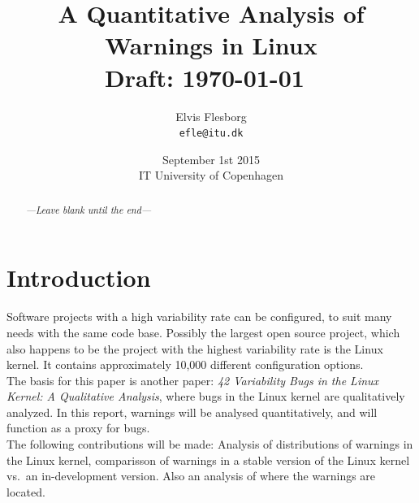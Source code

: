 \documentclass[a4paper,11pt]{report}
\begin{document}
\setlength{\parindent}{0cm}
\setlength{\unitlength}{1mm}

\date{September 1st 2015\\ IT University of Copenhagen}
\title{A Quantitative Analysis of Warnings in Linux \\ Draft: 
    \today~\currenttime}
\author{Elvis Flesborg\\
\texttt{efle@itu.dk}}
\clearpage\maketitle
\thispagestyle{empty}
\newpage

\tableofcontents
\thispagestyle{empty}



\newpage

\setcounter{page}{1}


\begin{abstract}
    \emph{---Leave blank until the end---}

\end{abstract}


\chapter{Introduction}
Software projects with a high variability rate can be configured, to suit many
needs with the same code base. Possibly the largest open source project, which 
also happens to be the project with the highest variability rate
is the Linux kernel. It contains approximately 10,000 different configuration 
options.
\\

The basis for this paper is another  paper: \emph{42 Variability 
Bugs in the Linux Kernel: A Qualitative Analysis}\cite{42bugs}, where bugs in 
the Linux kernel are qualitatively analyzed. In this report, warnings will be 
analysed quantitatively, and will function as a proxy for bugs.
\\

The following contributions will be made: Analysis of distributions of warnings 
in the Linux kernel, comparisson of warnings in a stable version of the Linux 
kernel vs.\ an in-development version. Also an analysis of where the warnings 
are located.
\end{document}
